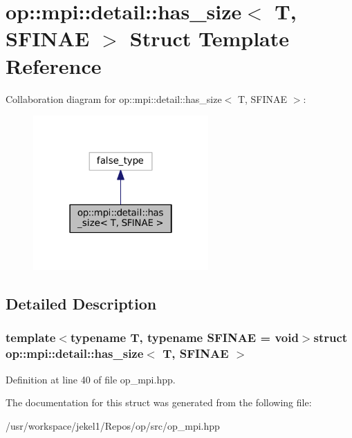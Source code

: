 \hypertarget{structop_1_1mpi_1_1detail_1_1has__size}{\section{op\-:\-:mpi\-:\-:detail\-:\-:has\-\_\-size$<$ T, S\-F\-I\-N\-A\-E $>$ Struct Template Reference}
\label{structop_1_1mpi_1_1detail_1_1has__size}
}


Collaboration diagram for op\-:\-:mpi\-:\-:detail\-:\-:has\-\_\-size$<$ T, S\-F\-I\-N\-A\-E $>$\-:
\nopagebreak
\begin{figure}[H]
\begin{center}
\leavevmode
\includegraphics[width=190pt]{structop_1_1mpi_1_1detail_1_1has__size__coll__graph}
\end{center}
\end{figure}


\subsection{Detailed Description}
\subsubsection*{template$<$typename T, typename S\-F\-I\-N\-A\-E = void$>$struct op\-::mpi\-::detail\-::has\-\_\-size$<$ T, S\-F\-I\-N\-A\-E $>$}



Definition at line 40 of file op\-\_\-mpi.\-hpp.



The documentation for this struct was generated from the following file\-:\begin{DoxyCompactItemize}
\item 
/usr/workspace/jekel1/\-Repos/op/src/op\-\_\-mpi.\-hpp\end{DoxyCompactItemize}
